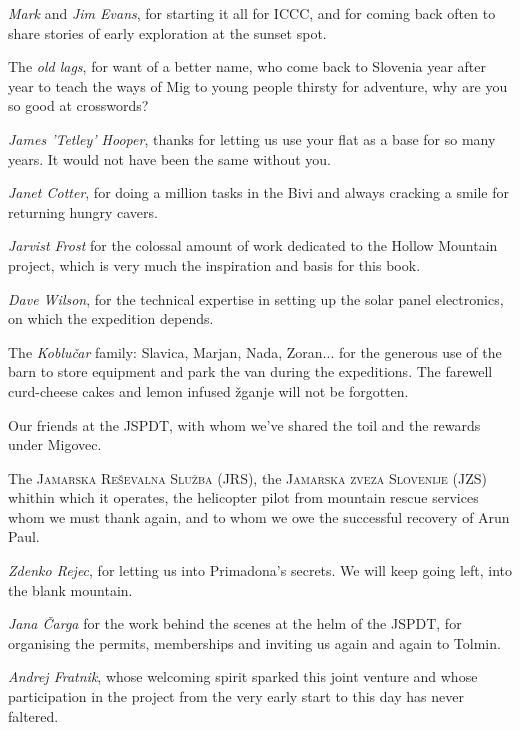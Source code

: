 \begin{citemize}
\item \emph{Mark} and \emph{Jim Evans}, for starting it all for ICCC, and for coming back often to share stories of early exploration at the sunset spot.
\item The \emph{old lags}, for want of a better name, who come back to Slovenia year after year to teach the ways of Mig to young people thirsty for adventure, why are you so good at crosswords?
\item \emph{James 'Tetley' Hooper}, thanks for letting us use your flat as a base for so many years. It would not have been the same without you.
\item \emph{Janet Cotter}, for doing a million tasks in the Bivi and always cracking a smile for returning hungry cavers. 
\item \emph{Jarvist Frost} for the colossal amount of work dedicated to the Hollow Mountain project, which is very much the inspiration and basis for this book. 
\item \emph{Dave Wilson}, for the technical expertise in setting up the solar panel electronics, on which the expedition depends.

\item The \emph{Koblu\v{c}ar} family: Slavica, Marjan, Nada, Zoran... for the generous use of the barn to store equipment and park the van during the expeditions. The farewell curd-cheese cakes and lemon infused \v{z}ganje will not be forgotten.

\item Our friends at the JSPDT, with whom we've shared the toil and the rewards under Migovec.
\item The \textsc{Jamarska Re\v{s}evalna Slu\v{z}ba} (JRS), the \textsc{Jamarska zveza Slovenije} (JZS) whithin which it operates, the helicopter pilot from mountain rescue services whom we must thank again, and to whom we owe the successful recovery of Arun Paul.
\item \emph{Zdenko Rejec}, for letting us into Primadona's secrets. We will keep going left, into the blank mountain.
\item \emph{Jana \v{C}arga} for the work behind the scenes at the helm of the JSPDT, for organising the permits, memberships and inviting us again and again to Tolmin.
\item \emph{Andrej Fratnik}, whose welcoming spirit sparked this joint venture and whose participation in the project from the very early start to this day has never faltered. 
\end{citemize}
